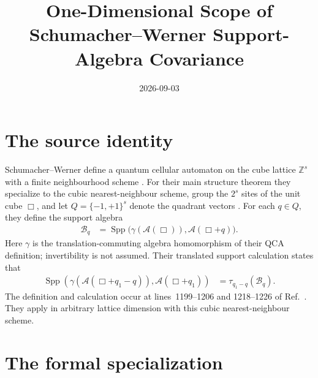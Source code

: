 \documentclass{article}
\title{One-Dimensional Scope of Schumacher--Werner Support-Algebra Covariance}
\author{}
\date{2026-09-03}
\begin{document}
\maketitle
{}

\section{The source identity}

Schumacher--Werner define a quantum cellular automaton on the cube lattice
$\mathbb Z^s$ with a finite neighbourhood scheme
\cite[lines~309--318]{SchumacherWerner2004QCA}. For their main structure
theorem they specialize to the cubic nearest-neighbour scheme, group the
$2^s$ sites of the unit cube $\Box$, and let $Q=\{-1,+1\}^s$ denote the
quadrant vectors \cite[lines~920--941]{SchumacherWerner2004QCA}. For each
$q\in Q$, they define the support algebra
\begin{align}
    \mathcal B_q
     & =\operatorname{Spp}\bigl(\gamma(\mathcal A(\Box)),
    \mathcal A(\Box+q)\bigr).
    \label{eq:sw04_support_covariance_scope_support}
\end{align}
Here $\gamma$ is the translation-commuting algebra homomorphism of their QCA
definition; invertibility is not assumed. Their translated
support calculation states that
\begin{align}
    \operatorname{Spp}(  \gamma(\mathcal A(\Box+q_1-q)),\mathcal A(\Box+q_1))
     & =\tau_{q_1-q}(\mathcal B_q).
    \label{eq:sw04_support_covariance_scope_source}
\end{align}
The definition and calculation occur at lines~1199--1206 and 1218--1226 of
Ref.~\cite{SchumacherWerner2004QCA}. They apply in arbitrary lattice
dimension with this cubic nearest-neighbour scheme.

\section{The formal specialization}
\end{document}
